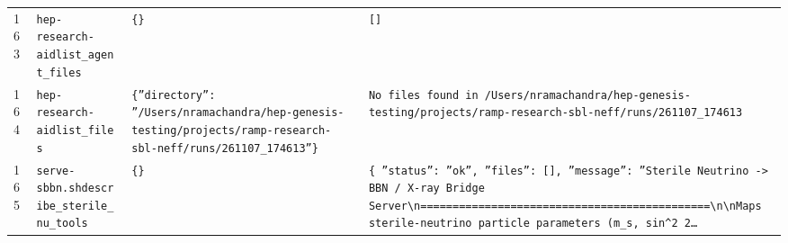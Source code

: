\documentclass[11pt,a4paper]{article}
\begin{document}
\begin{longtable}{@{}p{}p{}p{}p{}@{}}
163 & \texttt{hep-research-aid}\newline\texttt{list\_\allowbreak{}agent\_\allowbreak{}files} & \texttt{\{\}\allowbreak{}} & \texttt{[]\allowbreak{}} \\
164 & \texttt{hep-research-aid}\newline\texttt{list\_\allowbreak{}files} & \texttt{\{''directory'':\allowbreak{} ''/\allowbreak{}Users/\allowbreak{}nramachandra/\allowbreak{}hep-genesis-testing/\allowbreak{}projects/\allowbreak{}ramp-research-sbl-neff/\allowbreak{}runs/\allowbreak{}261107\_\allowbreak{}174613''\}\allowbreak{}} & \texttt{No files found in /\allowbreak{}Users/\allowbreak{}nramachandra/\allowbreak{}hep-genesis-testing/\allowbreak{}projects/\allowbreak{}ramp-research-sbl-neff/\allowbreak{}runs/\allowbreak{}261107\_\allowbreak{}174613} \\
165 & \texttt{serve-sbbn.sh}\newline\texttt{describe\_\allowbreak{}sterile\_\allowbreak{}nu\_\allowbreak{}tools} & \texttt{\{\}\allowbreak{}} & \texttt{\{   ''status'':\allowbreak{} ''ok'',\allowbreak{}   ''files'':\allowbreak{} []\allowbreak{},\allowbreak{}   ''message'':\allowbreak{} ''Sterile Neutrino -\textgreater{}\allowbreak{} BBN /\allowbreak{} X-ray Bridge Server\textbackslash{}\allowbreak{}n=\allowbreak{}=\allowbreak{}=\allowbreak{}=\allowbreak{}=\allowbreak{}=\allowbreak{}=\allowbreak{}=\allowbreak{}=\allowbreak{}=\allowbreak{}=\allowbreak{}=\allowbreak{}=\allowbreak{}=\allowbreak{}=\allowbreak{}=\allowbreak{}=\allowbreak{}=\allowbreak{}=\allowbreak{}=\allowbreak{}=\allowbreak{}=\allowbreak{}=\allowbreak{}=\allowbreak{}=\allowbreak{}=\allowbreak{}=\allowbreak{}=\allowbreak{}=\allowbreak{}=\allowbreak{}=\allowbreak{}=\allowbreak{}=\allowbreak{}=\allowbreak{}=\allowbreak{}=\allowbreak{}=\allowbreak{}=\allowbreak{}=\allowbreak{}=\allowbreak{}=\allowbreak{}=\allowbreak{}=\allowbreak{}=\allowbreak{}=\allowbreak{}\textbackslash{}\allowbreak{}n\textbackslash{}\allowbreak{}nMaps sterile-neutrino particle parameters (m\_\allowbreak{}s,\allowbreak{} sin\textasciicircum{}\allowbreak{}2 2\ldots{}\allowbreak{}} \\

\end{longtable}
\end{document}
